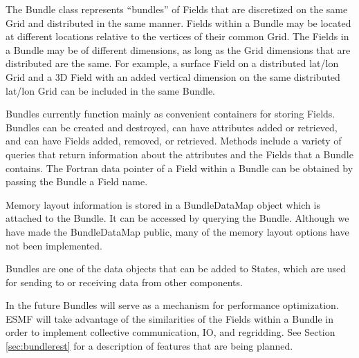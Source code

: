 
The Bundle class represents ``bundles'' of Fields that are 
discretized on the same Grid and distributed in the same manner.  
Fields within a Bundle may be located at different locations relative 
to the vertices of their common Grid.  The Fields in a Bundle may
be of different dimensions, as long as the Grid dimensions that 
are distributed are the same.  For example, a surface Field on 
a distributed lat/lon Grid and a 3D Field with an added vertical 
dimension on the same distributed lat/lon Grid can be included
in the same Bundle.
 
Bundles currently function mainly as convenient containers for storing 
Fields.  Bundles can be created and destroyed, can have attributes 
added or retrieved, and can have Fields added, removed, or retrieved.
Methods include a variety of queries that return information about 
the attributes and the Fields that a Bundle contains.  The Fortran 
data pointer of a Field within a Bundle can be obtained 
by passing the Bundle a Field name.  

Memory layout information is stored in a BundleDataMap object 
which is attached to the Bundle.  It can be accessed by querying the 
Bundle.  Although we have made the BundleDataMap public, many of 
the memory layout options have not been implemented.

Bundles are one of the data objects that can be added to States,
which are used for sending to or receiving data from other components.

In the future Bundles will serve as a mechanism for performance
optimization.  ESMF will take advantage of the similarities of the
Fields within a Bundle in order to implement collective communication,
IO, and regridding.  See Section \ref{sec:bundlerest} for a 
description of features that are being planned.





